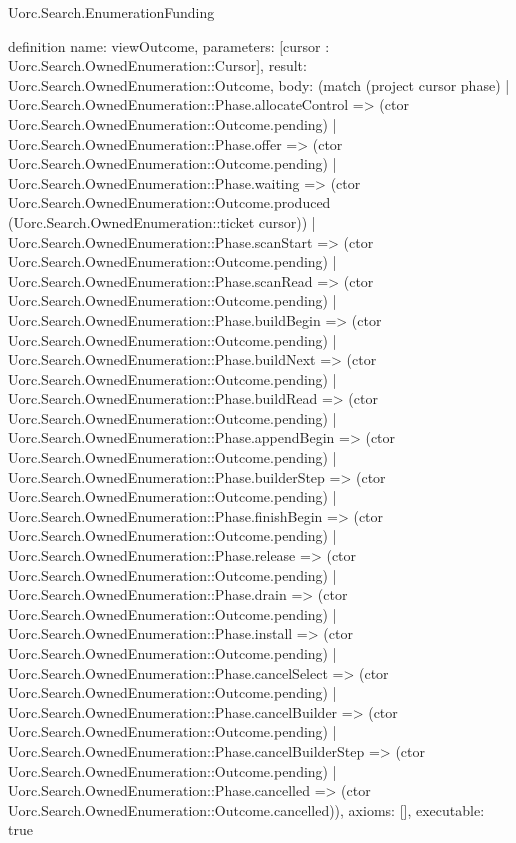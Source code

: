 \begin{lexlean}{Uorc.Search.EnumerationFunding}
\begin{semanticmodule}
definition{
  name: viewOutcome,
  parameters: [cursor : Uorc.Search.OwnedEnumeration::Cursor],
  result: Uorc.Search.OwnedEnumeration::Outcome,
  body: (match (project cursor phase)
    | Uorc.Search.OwnedEnumeration::Phase.allocateControl => (ctor Uorc.Search.OwnedEnumeration::Outcome.pending)
    | Uorc.Search.OwnedEnumeration::Phase.offer => (ctor Uorc.Search.OwnedEnumeration::Outcome.pending)
    | Uorc.Search.OwnedEnumeration::Phase.waiting => (ctor Uorc.Search.OwnedEnumeration::Outcome.produced (Uorc.Search.OwnedEnumeration::ticket cursor))
    | Uorc.Search.OwnedEnumeration::Phase.scanStart => (ctor Uorc.Search.OwnedEnumeration::Outcome.pending)
    | Uorc.Search.OwnedEnumeration::Phase.scanRead => (ctor Uorc.Search.OwnedEnumeration::Outcome.pending)
    | Uorc.Search.OwnedEnumeration::Phase.buildBegin => (ctor Uorc.Search.OwnedEnumeration::Outcome.pending)
    | Uorc.Search.OwnedEnumeration::Phase.buildNext => (ctor Uorc.Search.OwnedEnumeration::Outcome.pending)
    | Uorc.Search.OwnedEnumeration::Phase.buildRead => (ctor Uorc.Search.OwnedEnumeration::Outcome.pending)
    | Uorc.Search.OwnedEnumeration::Phase.appendBegin => (ctor Uorc.Search.OwnedEnumeration::Outcome.pending)
    | Uorc.Search.OwnedEnumeration::Phase.builderStep => (ctor Uorc.Search.OwnedEnumeration::Outcome.pending)
    | Uorc.Search.OwnedEnumeration::Phase.finishBegin => (ctor Uorc.Search.OwnedEnumeration::Outcome.pending)
    | Uorc.Search.OwnedEnumeration::Phase.release => (ctor Uorc.Search.OwnedEnumeration::Outcome.pending)
    | Uorc.Search.OwnedEnumeration::Phase.drain => (ctor Uorc.Search.OwnedEnumeration::Outcome.pending)
    | Uorc.Search.OwnedEnumeration::Phase.install => (ctor Uorc.Search.OwnedEnumeration::Outcome.pending)
    | Uorc.Search.OwnedEnumeration::Phase.cancelSelect => (ctor Uorc.Search.OwnedEnumeration::Outcome.pending)
    | Uorc.Search.OwnedEnumeration::Phase.cancelBuilder => (ctor Uorc.Search.OwnedEnumeration::Outcome.pending)
    | Uorc.Search.OwnedEnumeration::Phase.cancelBuilderStep => (ctor Uorc.Search.OwnedEnumeration::Outcome.pending)
    | Uorc.Search.OwnedEnumeration::Phase.cancelled => (ctor Uorc.Search.OwnedEnumeration::Outcome.cancelled)),
  axioms: [],
  executable: true
}


\end{semanticmodule}
\end{lexlean}
